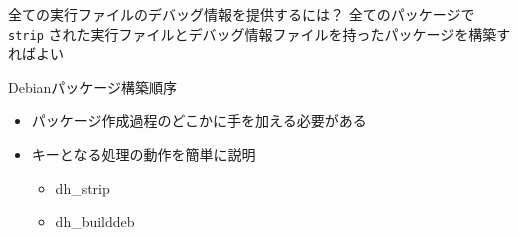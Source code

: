 %
%
%
%
\begin{frame}{全ての実行ファイルのデバッグ情報を提供するには？}
\pause
全てのパッケージで
\texttt{strip} された実行ファイルとデバッグ情報ファイルを持ったパッケージを構築すればよい
\end{frame}
\begin{frame}{Debianパッケージ構築順序}
\pause
\begin{itemize}[<+->]
\item パッケージ作成過程のどこかに手を加える必要がある
\item キーとなる処理の動作を簡単に説明
\begin{itemize}
\item dh\_strip
\item dh\_builddeb
\end{itemize}

\end{itemize}
\end{frame}

